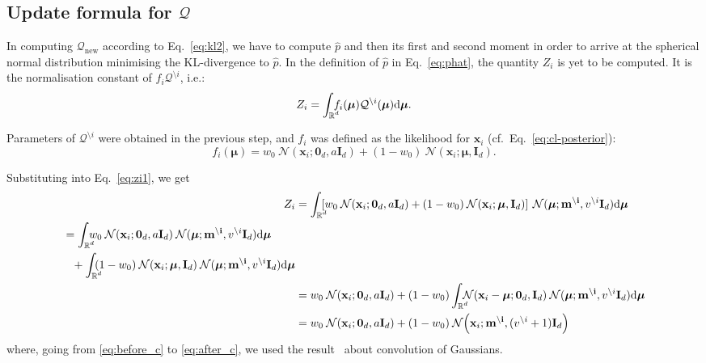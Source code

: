 \documentclass[11pt]{article}
\newcommand{\vek}[1]{\ensuremath{\mathbf{#1}}}
\newcommand{\kve}{\ensuremath{\mathcal{Q}}}
\newcommand{\byd}{\ensuremath{\mathrm{d}}}
\newcommand{\norm}{\ensuremath{\:\mathcal{N}}}
\newcommand{\unity}{\ensuremath{\mathbf{I}}}
\newcommand{\real}{\ensuremath{\mathbb{R}}}
\newcommand{\intrc}{\ensuremath{\int_{\rlap{\scriptsize$\real^d$}}\:}}
\newcommand{\intrcc}{\ensuremath{\int_{\rlap{\scriptsize$\real^d$}}}}
\begin{document}
\subsection*{Update formula for $\kve$}
In computing $\kve_{\text{new}}$ according to Eq.~\eqref{eq:kl2}, we have 
to compute $\hat{p}$ and then its first and second moment in order to 
arrive at the spherical normal distribution minimising the KL-divergence to 
$\hat{p}$. In the definition of $\hat{p}$ in Eq.~\eqref{eq:phat}, the 
quantity $Z_i$ is yet to be computed. It is the normalisation constant of 
$f_i\kve^{\setminus i}$, i.e.:
\begin{equation}
	Z_i = \intrc f_i(\boldsymbol{\mu})\kve^{\setminus i}(\boldsymbol{\mu})\byd\boldsymbol{\mu}.
	\label{eq:zi1}
\end{equation}

Parameters of $\kve^{\setminus i}$ were obtained in the previous step, 
and $f_i$ was defined as the likelihood for $\vek{x}_i$ (cf.\ 
Eq.~\eqref{eq:cl-posterior}):
\begin{equation}
	f_i(\boldsymbol{\mu}) = w_0 \norm(\vek{x}_i; \vek{0}_d, a\unity_{d}) + (1 - w_0) 
\norm(\vek{x}_i; \boldsymbol{\mu}, \unity_{d}).
\end{equation}

Substituting into Eq.~\eqref{eq:zi1}, we get
\begin{align}
	Z_i &= \intrc \left[w_0  \norm(\vek{x}_i; \vek{0}_d, a\unity_{d})
										 + (1 - w_0) \norm(\vek{x}_i; \boldsymbol{\mu}, \unity_{d})\right]
							 \norm(\boldsymbol{\mu}; \vek{m^{\setminus i}}, v^{\setminus i}\unity_{d})
					\byd\boldsymbol{\mu} \\
			\begin{split}
				 &=\intrc w_0  \norm(\vek{x}_i; \vek{0}_d, a\unity_{d})
							 \norm(\boldsymbol{\mu}; \vek{m^{\setminus i}}, v^{\setminus i}\unity_{d})
					\byd\boldsymbol{\mu}\\
			&\hphantom{=}+  \intrc (1 - w_0) \norm(\vek{x}_i; \boldsymbol{\mu}, 
							 \unity_{d})
							 \norm(\boldsymbol{\mu}; \vek{m^{\setminus i}}, v^{\setminus i}\unity_{d})
					\byd\boldsymbol{\mu}
				 \end{split} \\
			&= w_0  \norm(\vek{x}_i; \vek{0}_d, a\unity_{d})
			+  (1 - w_0) \intrcc\norm(\vek{x}_i - \boldsymbol{\mu}; \vek{0}_d, 
							 \unity_{d})
							 \norm(\boldsymbol{\mu}; \vek{m^{\setminus i}}, v^{\setminus i}\unity_{d})
					\byd\boldsymbol{\mu}
			\label{eq:before_c} \\
			&= w_0  \norm(\vek{x}_i; \vek{0}_d, a\unity_{d})
			+  (1 - w_0)\norm\!\left(\vek{x}_i; \vek{m^{\setminus i}}, (v^{\setminus i} 
+ 1)\unity_{d}\right)
			\label{eq:after_c}
\end{align}
where, going from \eqref{eq:before_c} to \eqref{eq:after_c}, we used the 
result~\cite{tina-2003} about convolution of Gaussians.
\end{document}
